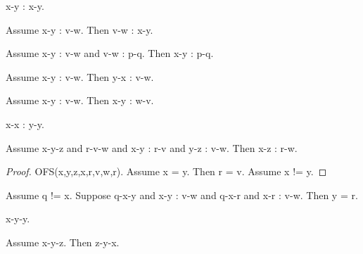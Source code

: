 \documentclass{article}
\begin{document}
\begin{forthel}
    \begin{lemma}[L2_1]
      x-y : x-y.
    \end{lemma}

    \begin{lemma}[L2_2]
      Assume x-y : v-w. Then v-w : x-y.
    \end{lemma}

    \begin{lemma}[L2_3]
      Assume x-y : v-w and v-w : p-q. Then x-y : p-q.
    \end{lemma}

    \begin{lemma}[L2_4]
      Assume x-y : v-w. Then y-x : v-w.
    \end{lemma}

    \begin{lemma}[L2_5]
      Assume x-y : v-w. Then x-y : w-v.
    \end{lemma}

    \begin{lemma}[L2_8]
      x-x : y-y.
    \end{lemma}

    \begin{lemma}[L2_11]
      Assume x-y-z and r-v-w and x-y : r-v and y-z : v-w. Then x-z : r-w.
    \end{lemma}
    \begin{proof}
      OFS(x,y,z,x,r,v,w,r).     %
      Assume x = y. Then r = v. %
      Assume x != y.            %
    \end{proof}

    \begin{lemma}[L2_12]
      Assume q != x. Suppose q-x-y and x-y : v-w and q-x-r and x-r : v-w. Then
      y = r.
    \end{lemma}

    \begin{lemma}[L3_1]
      x-y-y.
    \end{lemma}

    \begin{lemma}[L3_2]
      Assume x-y-z. Then z-y-x.
    \end{lemma}


\end{forthel}
\end{document}

